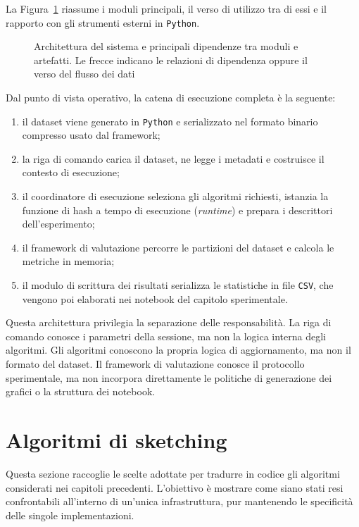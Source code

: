 La Figura~\ref{fig:system-architecture} riassume i moduli principali, il verso
di utilizzo tra di essi e il rapporto con gli strumenti esterni in
\texttt{Python}.

\begin{figure}[htbp]
    \centering
    \resizebox{0.98\textwidth}{!}{}
    \caption{Architettura del sistema e principali dipendenze tra moduli e artefatti. Le frecce indicano le relazioni di dipendenza oppure il verso del flusso dei dati}
    \label{fig:system-architecture}
\end{figure}

Dal punto di vista operativo, la catena di esecuzione completa è la seguente:
\begin{enumerate}
    \item il dataset viene generato in \texttt{Python} e serializzato
    nel formato binario compresso usato dal framework;
    \item la riga di comando carica il dataset, ne legge i metadati e costruisce
    il contesto di esecuzione;
    \item il coordinatore di esecuzione seleziona gli algoritmi richiesti,
    istanzia la funzione di hash a tempo di esecuzione (\emph{runtime}) e
    prepara i descrittori dell'esperimento;
    \item il framework di valutazione percorre le partizioni del dataset e
    calcola le metriche in memoria;
    \item il modulo di scrittura dei risultati serializza le statistiche in file
    \texttt{CSV}, che vengono poi elaborati nei notebook del capitolo
    sperimentale.
\end{enumerate}

Questa architettura privilegia la separazione delle responsabilità. La riga di
comando conosce i parametri della sessione, ma non la logica interna degli
algoritmi. Gli algoritmi conoscono la propria logica di aggiornamento, ma non il
formato del dataset. Il framework di valutazione conosce il protocollo
sperimentale, ma non incorpora direttamente le politiche di generazione dei
grafici o la struttura dei notebook.

\section{Algoritmi di sketching}

Questa sezione raccoglie le scelte adottate per tradurre in codice gli algoritmi
considerati nei capitoli precedenti. L'obiettivo è mostrare come siano stati
resi confrontabili all'interno di un'unica infrastruttura, pur mantenendo le
specificità delle singole implementazioni.

